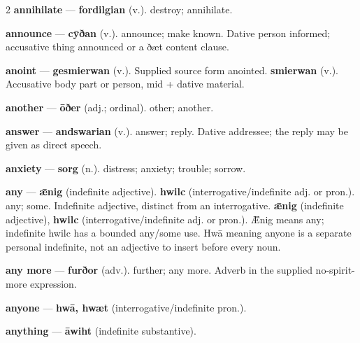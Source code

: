 \begin{multicols}{2}
\textbf{annihilate} — \textbf{fordilgian} (v.). destroy; annihilate.\par
\textbf{announce} — \textbf{cȳðan} (v.). announce; make known. Dative person informed; accusative thing announced or a ðæt content clause.\par
\textbf{anoint} — \textbf{gesmierwan} (v.). Supplied source form anointed. \textbf{smierwan} (v.). Accusative body part or person, mid + dative material.\par
\textbf{another} — \textbf{ōðer} (adj.; ordinal). other; another.\par
\textbf{answer} — \textbf{andswarian} (v.). answer; reply. Dative addressee; the reply may be given as direct speech.\par
\textbf{anxiety} — \textbf{sorg} (n.). distress; anxiety; trouble; sorrow.\par
\textbf{any} — \textbf{ǣnig} (indefinite adjective).  \textbf{hwilc} (interrogative/indefinite adj. or pron.). any; some. Indefinite adjective, distinct from an interrogative. \textbf{ǣnig} (indefinite adjective), \textbf{hwilc} (interrogative/indefinite adj. or pron.). Ǣnig means any; indefinite hwilc has a bounded any/some use. Hwā meaning anyone is a separate personal indefinite, not an adjective to insert before every noun.\par
\textbf{any more} — \textbf{furðor} (adv.). further; any more. Adverb in the supplied no-spirit-more expression.\par
\textbf{anyone} — \textbf{hwā, hwæt} (interrogative/indefinite pron.).\par
\textbf{anything} — \textbf{āwiht} (indefinite substantive).\par

\end{multicols}

